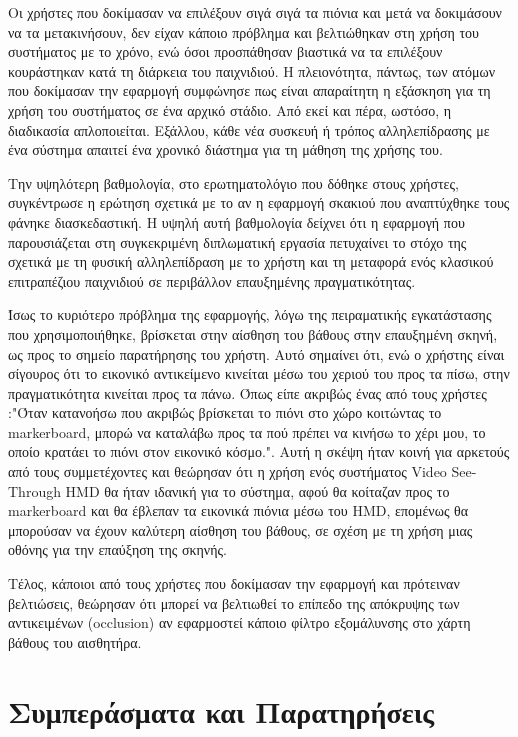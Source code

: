 Οι χρήστες που δοκίμασαν να επιλέξουν σιγά σιγά τα πιόνια και μετά να δοκιμάσουν να τα μετακινήσουν, δεν είχαν κάποιο πρόβλημα και βελτιώθηκαν στη χρήση του συστήματος με το χρόνο, ενώ όσοι προσπάθησαν βιαστικά να τα επιλέξουν κουράστηκαν κατά τη διάρκεια του παιχνιδιού. Η πλειονότητα, πάντως, των ατόμων που δοκίμασαν την εφαρμογή συμφώνησε πως είναι απαραίτητη η εξάσκηση για τη χρήση του συστήματος σε ένα αρχικό στάδιο. Από εκεί και πέρα, ωστόσο, η διαδικασία απλοποιείται. Εξάλλου, κάθε νέα συσκευή ή τρόπος αλληλεπίδρασης με ένα σύστημα απαιτεί ένα χρονικό διάστημα για τη μάθηση της χρήσης του.


Την υψηλότερη βαθμολογία, στο ερωτηματολόγιο που δόθηκε στους χρήστες, συγκέντρωσε η ερώτηση σχετικά με το αν η εφαρμογή σκακιού που αναπτύχθηκε τους φάνηκε διασκεδαστική. Η υψηλή αυτή βαθμολογία δείχνει ότι η εφαρμογή που παρουσιάζεται στη συγκεκριμένη διπλωματική εργασία πετυχαίνει το στόχο της σχετικά με τη φυσική αλληλεπίδραση με το χρήστη και τη μεταφορά ενός κλασικού επιτραπέζιου παιχνιδιού σε περιβάλλον επαυξημένης πραγματικότητας.


Ίσως το κυριότερο πρόβλημα της εφαρμογής, λόγω της πειραματικής εγκατάστασης που χρησιμοποιήθηκε, βρίσκεται στην αίσθηση του βάθους στην επαυξημένη σκηνή, ως προς το σημείο παρατήρησης του χρήστη. Αυτό σημαίνει ότι, ενώ ο χρήστης είναι σίγουρος ότι το εικονικό αντικείμενο κινείται μέσω του χεριού του προς τα πίσω, στην πραγματικότητα κινείται προς τα πάνω. Όπως είπε ακριβώς ένας από τους χρήστες :"Όταν κατανοήσω που ακριβώς βρίσκεται το πιόνι στο χώρο κοιτώντας το markerboard, μπορώ να καταλάβω προς τα πού πρέπει να κινήσω το χέρι μου, το οποίο κρατάει το πιόνι στον εικονικό κόσμο.". Αυτή η σκέψη ήταν κοινή για αρκετούς από τους συμμετέχοντες και θεώρησαν ότι η χρήση ενός συστήματος Video See-Through HMD θα ήταν ιδανική για το σύστημα, αφού θα κοίταζαν προς το markerboard και θα έβλεπαν τα εικονικά πιόνια μέσω του HMD, επομένως θα μπορούσαν να έχουν καλύτερη αίσθηση του βάθους, σε σχέση με τη χρήση μιας οθόνης για την επαύξηση της σκηνής.



Τέλος, κάποιοι από τους χρήστες που δοκίμασαν την εφαρμογή και πρότειναν βελτιώσεις, θεώρησαν ότι μπορεί να βελτιωθεί το επίπεδο της απόκρυψης των αντικειμένων (occlusion) αν εφαρμοστεί κάποιο φίλτρο εξομάλυνσης στο χάρτη βάθους του αισθητήρα.







\section{Συμπεράσματα και Παρατηρήσεις} \label{sec:conclusion}


